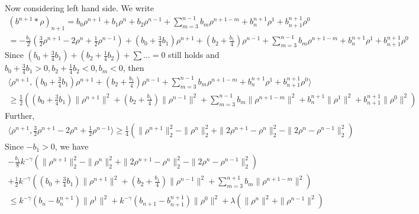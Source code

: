 \documentclass[11pt]{article}
\begin{document}
Now considering left hand side. We write
\begin{multline*}
(b^{n+1}*\rho)_{n+1}
=b_0\rho^{n+1}+b_1\rho^n+b_2\rho^{n-1}
+\sum_{m=3}^{n-1}b_m\rho^{n+1-m}+b^{n+1}_n\rho^1+b^{n+1}_{n+1}\rho^0\\
=-\frac{b_1}{2}(\frac{3}{2}\rho^{n+1}-2\rho^n+\frac{1}{2}\rho^{n-1})
+(b_0+\frac{3}{4}b_1)\rho^{n+1}
+(b_2+\frac{b_1}{4})\rho^{n-1}
+\sum_{m=3}^{n-1}b_m\rho^{n+1-m}+b^{n+1}_n\rho^1+b^{n+1}_{n+1}\rho^0
\end{multline*}
Since $(b_0+\frac{3}{4}b_1)+(b_2+\frac{1}{4}b_2)+\sum\ldots=0$ still holds and $b_0+\frac{3}{4}b_1>0, b_2+\frac{1}{4}b_2<0, b_m<0$, then
\begin{multline*}
\langle \rho^{n+1}, (b_0+\frac{3}{4}b_1)\rho^{n+1}
+(b_2+\frac{b_1}{4})\rho^{n-1}
+\sum_{m=3}^{n-1}b_m\rho^{n+1-m}+b^{n+1}_n\rho^1+b^{n+1}_{n+1}\rho^0\rangle\\
\ge \frac{1}{2}\left((b_0+\frac{3}{4}b_1)\|\rho^{n+1}\|^2
+(b_2+\frac{b_1}{4})\|\rho^{n-1}\|^2
+\sum_{m=3}^{n-1}b_m\|\rho^{n+1-m}\|^2+b^{n+1}_n\|\rho^1\|^2+b^{n+1}_{n+1}\|\rho^0\|^2\right)
\end{multline*}
Further, 
\begin{multline*}
\langle \rho^{n+1}, \frac{3}{2}\rho^{n+1}-2\rho^n+\frac{1}{2}\rho^{n-1}\rangle
\ge \frac{1}{4}(\|\rho^{n+1}\|_2^2-\|\rho^n\|_2^2+\|2\rho^{n+1}-\rho^n\|_2^2-\|2\rho^n-\rho^{n-1}\|_2^2)
\end{multline*}
Since $-b_1>0$, we have
\begin{multline*}
-\frac{b_1}{8}k^{-\gamma}(\|\rho^{n+1}\|_2^2-\|\rho^n\|_2^2+\|2\rho^{n+1}-\rho^n\|_2^2-\|2\rho^n-\rho^{n-1}\|_2^2)\\
+\frac{1}{2}k^{-\gamma}\left((b_0+\frac{3}{4}b_1)\|\rho^{n+1}\|^2
+(b_2+\frac{b_1}{4})\|\rho^{n-1}\|^2
+\sum_{m=3}^{n+1}b_m\|\rho^{n+1-m}\|^2\right)\\
\le k^{-\gamma}(b_{n}-b^{n+1}_n)\|\rho^1\|^2
+k^{-\gamma}(b_{n+1}-b_{n+1}^{n+1})\|\rho^0\|^2+\lambda(\|\rho^n\|^2+\|\rho^{n-1}\|^2)
\end{multline*}
\end{document}
